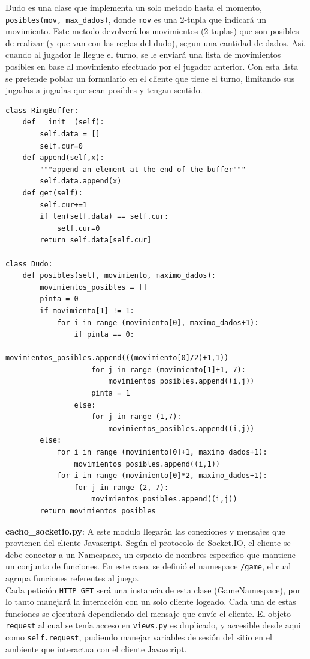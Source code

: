 \documentclass[a4paper,11pt]{article}
\begin{document}
Dudo es una clase que implementa un solo metodo hasta el momento, \texttt{posibles(mov, max\_dados)}, donde \texttt{mov} es una 2-tupla que indicará un movimiento. Este metodo devolverá
los movimientos (2-tuplas) que son posibles de realizar (y que van con las reglas del dudo), segun una cantidad de dados. Así, cuando al jugador le llegue el turno, se le enviará una lista de movimientos posibles en base al movimiento efectuado por el jugador anterior. Con esta lista se pretende poblar un formulario en el cliente que tiene el turno, limitando sus jugadas a jugadas que sean posibles y tengan sentido.
\begin{lstlisting}[caption=Dudo.py]
class RingBuffer:
	def __init__(self):
		self.data = []
		self.cur=0
	def append(self,x):
		"""append an element at the end of the buffer"""
		self.data.append(x)
	def get(self):
		self.cur+=1
		if len(self.data) == self.cur:
			self.cur=0 	
		return self.data[self.cur]

class Dudo:
	def posibles(self, movimiento, maximo_dados):
		movimientos_posibles = []
		pinta = 0
		if movimiento[1] != 1:
			for i in range (movimiento[0], maximo_dados+1):
				if pinta == 0:
					movimientos_posibles.append(((movimiento[0]/2)+1,1))
					for j in range (movimiento[1]+1, 7):
						movimientos_posibles.append((i,j))
					pinta = 1
				else:
					for j in range (1,7):
						movimientos_posibles.append((i,j))
		else:
			for i in range (movimiento[0]+1, maximo_dados+1):
				movimientos_posibles.append((i,1))
			for i in range (movimiento[0]*2, maximo_dados+1):
				for j in range (2, 7):
					movimientos_posibles.append((i,j))
		return movimientos_posibles
\end{lstlisting}

\newpage
\textbf{cacho\_socketio.py}: A este modulo llegarán las conexiones y mensajes que 
provienen del cliente Javascript. Según el protocolo de Socket.IO, el cliente 
se debe conectar a un Namespace, un espacio de nombres especifico que mantiene 
un conjunto de funciones. En este caso, se definió el namespace 
\texttt{/game}, el cual agrupa funciones referentes al juego. \\

Cada petición \texttt{HTTP GET} será una instancia de esta clase (GameNamespace), por lo tanto
manejará la interacción con un solo cliente logeado. Cada una de estas funciones se ejecutará
dependiendo del mensaje que envíe el cliente. El objeto \texttt{request} al cual se tenía
acceso en \texttt{views.py} es duplicado, y accesible desde aqui como \texttt{self.request},
pudiendo manejar variables de sesión del sitio en el ambiente que interactua con el cliente Javascript.\\
\end{document}

